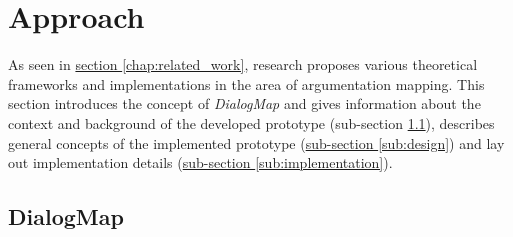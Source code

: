 \section{Approach}
\label{chap:approach}

As seen in \hyperref[chap:related_work]{section \ref{chap:related_work}}, research proposes various theoretical frameworks and implementations in the area of argumentation mapping. This section introduces the concept of \textit{DialogMap} and gives information about the context and background of the developed prototype (sub-section \ref{sub:dialogmap}), describes general concepts of the implemented prototype (\hyperref[sub:design]{sub-section \ref{sub:design}}) and lay out implementation details (\hyperref[sub:implementation]{sub-section \ref{sub:implementation}}).

\subsection{DialogMap}
\label{sub:dialogmap}

